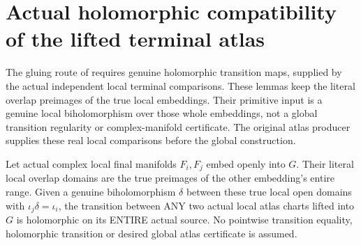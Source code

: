 \section{Actual holomorphic compatibility of the lifted terminal atlas}

The gluing route of \cite{bierstone-milman08-functoriality} requires genuine
holomorphic transition maps, supplied by the actual independent local
terminal comparisons. These lemmas keep the literal overlap preimages of
the true local embeddings. Their primitive input is a genuine local
biholomorphism over those whole embeddings, not a global transition
regularity or complex-manifold certificate. The original atlas producer
supplies these real local comparisons before the global construction.

\begin{lemma}
\label{hir:terminal-atlas-actual-biholomorphic-overlap-chart-transition}
\leanok
{}
Let actual complex local final manifolds $F_i,F_j$ embed openly into $G$.
Their literal local overlap domains are the true preimages of the other
embedding's entire range. Given a genuine biholomorphism $\delta$ between
these true local open domains with $\iota_j\delta=\iota_i$, the transition
between ANY two actual local atlas charts lifted into $G$ is holomorphic
on its ENTIRE actual source. No pointwise transition equality, holomorphic
transition or desired global atlas certificate is assumed.
\end{lemma}
